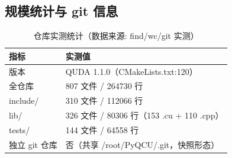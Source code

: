 \documentclass[UTF8]{ctexart}
\begin{document}
\subsection{规模统计与 git 信息}
\begin{table}[htbp]\centering
\begin{tabular}{ll}
\toprule
指标 & 实测值 \\
\midrule
版本 & QUDA 1.1.0（CMakeLists.txt:120） \\
全仓库 & 807 文件 / 264730 行 \\
include/ & 310 文件 / 112066 行 \\
lib/ & 326 文件 / 80306 行（153 .cu + 110 .cpp） \\
tests/ & 144 文件 / 64558 行 \\
独立 git 仓库 & 否（共享 /root/PyQCU/.git，快照形态） \\
\bottomrule
\end{tabular}
\caption{仓库实测统计（数据来源: find/wc/git 实测）}
\end{table}
\end{document}
